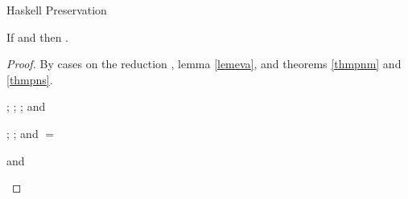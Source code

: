 \begin{theorem}{Haskell Preservation}

\label{thmpnh}

If \judeh{\env}{\first{\varexph}}{\first{\vartyh}} and \redruleh{\first{\varexph}}{\second{\varexph}} then \judeh{\env}{\second{\varexph}}{\first{\vartyh}}.

\begin{proof}

By cases on the reduction \redruleh{\first{\varexph}}{\second{\varexph}}, lemma \ref{lemeva}, and theorems \ref{thmpnm} and \ref{thmpns}.


\begin{case}{\osfapph}

\pnpremise
{\judeh{\env}{\osfapplh}{\second{\vartyh}}}
\pntypes
{
\judeh{\env}{\expfabss{\first{\varvarh}}{\first{\vartyh}}{\first{\varexph}}}{\tyfun{\first{\vartyh}}{\second{\vartyh}}};
\judeh{\envexte{\env}{\first{\varvarh}}{\first{\vartyh}}}{\first{\varexph}}{\second{\vartyh}};
\judeh{\env}{\second{\varexph}}{\first{\vartyh}}; and
\judeh{\envexte{\env}{\first{\varvarh}}{\first{\vartyh}}}{\first{\varvarh}}{\first{\vartyh}}
}
\pnexpsubst
{\judeh{\env}{\osfapprh}{\second{\vartyh}}}

\end{case}


\begin{case}{\ostapp}

\pnpremise
{\judeh{\env}{\ostappl}{\second{\vartyh}}}
\pntypes
{
\judeh{\env}{\exptabs{\first{\tyvarh}}{\first{\varexph}}}{\tyfor{\first{\tyvarh}}{\third{\vartyh}}};
\judeh{\envextt{\env}{\first{\tyvarh}}}{\first{\varexph}}{\third{\vartyh}}; and
\second{\vartyh} $=$ \tysubst{\third{\vartyh}}{\first{\vartyh}}{\first{\tyvarh}}
}
\pntysubst
{\judeh{\env}{\ostappr}{\tysubst{\third{\vartyh}}{\first{\vartyh}}{\first{\tyvarh}}}}

\end{case}


\begin{case}{\osfix}

\pnpremise
{\judeh{\env}{\osfixl}{\second{\vartyh}}}
\pntypes
{
\judeh{\env}{(\expfabss{\first{\varvarh}}{\first{\vartyh}}{\first{\varexph}})}{\tyfun{\first{\vartyh}}{\second{\vartyh}}} and
\judeh{\envexte{\env}{\first{\varvarh}}{\first{\vartyh}}}{\first{\varexph}}{\second{\vartyh}}
}
\pnexpsubst
{\judeh{\env}{\osfixr}{\second{\vartyh}}}


\end{case}
\end{proof}
\end{theorem}
